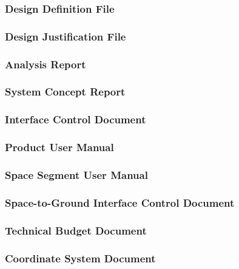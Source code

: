 \subsubsection{Design Definition File}
\label{app:Design Definition File}

\subsubsection{Design Justification File}
\label{app:Design Justification File}

\subsubsection{Analysis Report}
\label{app:Analysis Report}

\subsubsection{System Concept Report}
\label{app:System Concept Report}

\subsubsection{Interface Control Document}
\label{app:Interface Control Document}

\subsubsection{Product User Manual}
\label{app:Product User Manual}

\subsubsection{Space Segment User Manual}
\label{app:Space Segment User Manual}

\subsubsection{Space-to-Ground Interface Control Document}
\label{app:Space-to-Ground Interface Control Document}

\subsubsection{Technical Budget Document}
\label{app:Technical Budget Document}

\subsubsection{Coordinate System Document}
\label{app:Coordinate System Document}

